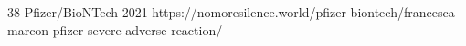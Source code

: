           {
          }
          {
            38
          }
          {
            Pfizer/BioNTech
          }
          {
            2021
          }
          {
          }
          {
            https://nomoresilence.world/pfizer-biontech/francesca-marcon-pfizer-severe-adverse-reaction/
          }

